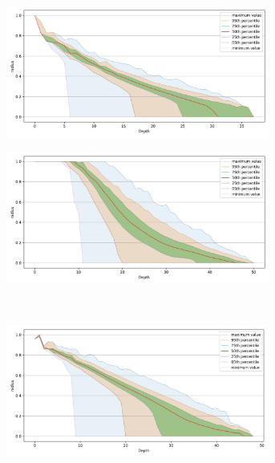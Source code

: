 \documentclass[review,supplement,onefignum,onetabnum]{siamonline220329}
\begin{document}
\begin{figure}[ht!]
    \begin{subfigure}[b]{0.47\textwidth}
    \includegraphics[width=0.95\textwidth]{images/radius/fashion-mnist-60000.png}\\
    \label{fig:results:fashion-mnist-radius}
    \end{subfigure}%
    \begin{subfigure}[b]{0.47\textwidth}
    \includegraphics[width=0.95\textwidth]{images/radius/glove-25-1183514.png}\\
    \label{fig:results:glove-25-radius}
    \end{subfigure}
    \vspace{1em}
    \\
    \begin{subfigure}[b]{0.47\textwidth}
    \includegraphics[width=0.95\textwidth]{images/radius/sift-1000000.png}\\

\end{subfigure}
\end{figure}
\end{document}
